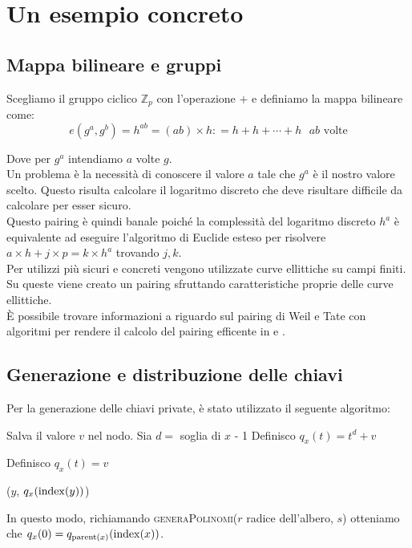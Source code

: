 \chapter{Un esempio concreto}
\label{esempio}

\section{Mappa bilineare e gruppi}

Scegliamo il gruppo ciclico $\mathbb{Z}_{p}$ con l'operazione $+$ e definiamo la mappa bilineare come:
\[ e(g^a,g^b) = h^{ab} = (ab) \times h : = h + h + \cdots + h \text{ $ab$ volte}\]

Dove per $g^a$ intendiamo $a$ volte $g$.\\


Un problema è la necessità di conoscere il valore $a$ tale che $g^a$ è il nostro valore scelto. Questo risulta calcolare il logaritmo discreto che deve risultare difficile da calcolare per esser sicuro.\\
Questo pairing è quindi banale poiché la complessità del logaritmo discreto $h^a$ è equivalente ad eseguire l'algoritmo di Euclide esteso per risolvere $a \times h + j \times p = k \times h^a$ trovando $j,k$.\\


Per utilizzi più sicuri e concreti vengono utilizzate curve ellittiche su campi finiti. Su queste viene creato un pairing sfruttando caratteristiche proprie delle curve ellittiche.\\
È possibile trovare informazioni a riguardo sul pairing di Weil e Tate con algoritmi per rendere il calcolo del pairing efficente in \cite{benoit} e \cite{maas}.


\section{Generazione e distribuzione delle chiavi}

Per la generazione delle chiavi private, è stato utilizzato il seguente algoritmo:
\vspace{0.3cm}
\begin{algorithmic}
   		\State Salva il valore $v$ nel nodo.
   \Else
   		\State Sia $d = $ soglia di $x$ - 1
   			\State Definisco $q_x(t) = t^d + v$ 

   		\Else
   			\State Definisco $q_x(t) = v$
   		
   		\EndIf

   			($y$, $q_x(\operatorname{index}(y))$) 
   		\EndFor
   \EndIf
\EndFunction
\end{algorithmic}
\vspace{0.3cm}
In questo modo, richiamando {\scshape generaPolinomi}($r$ radice dell'albero, $s$) otteniamo che $q_x(0) = q_{\operatorname{parent}(x)}(\operatorname{index}(x))$.\label{polinomi}\\[1cm]

